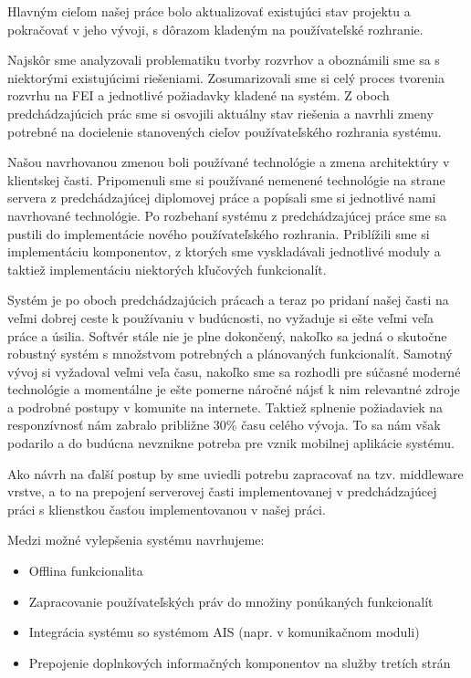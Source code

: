 Hlavným cieľom našej práce bolo aktualizovať existujúci stav projektu a pokračovať
v jeho vývoji, s dôrazom kladeným na používateľské rozhranie.

Najskôr sme analyzovali problematiku tvorby rozvrhov a oboznámili sme sa s niektorými
existujúcimi riešeniami. Zosumarizovali sme si celý proces tvorenia rozvrhu na FEI 
a jednotlivé požiadavky kladené na systém. Z oboch predchádzajúcich prác sme si osvojili aktuálny stav riešenia
a navrhli zmeny potrebné na docielenie stanovených cieľov používateľského rozhrania systému.

Našou navrhovanou zmenou boli používané technológie a zmena architektúry v klientskej časti.
Pripomenuli sme si používané nemenené technológie na strane servera z predchádzajúcej diplomovej
práce a popísali sme si jednotlivé nami navrhované technológie.
Po rozbehaní systému z predchádzajúcej práce sme sa pustili do implementácie nového používateľského rozhrania.
Priblížili sme si implementáciu komponentov, z ktorých sme vyskladávali jednotlivé moduly a taktiež implementáciu
niektorých kľučových funkcionalít.

Systém je po oboch predchádzajúcich prácach a teraz po pridaní našej časti na veľmi dobrej ceste
k používaniu v budúcnosti, no vyžaduje si ešte veľmi veľa práce a úsilia.
Softvér stále nie je plne dokončený, nakoľko sa jedná o skutočne robustný systém s množstvom
potrebných a plánovaných funkcionalít. Samotný vývoj si vyžadoval veľmi veľa času, nakoľko sme sa rozhodli
pre súčasné moderné technológie a momentálne je ešte pomerne náročné nájsť k nim relevantné zdroje
a podrobné postupy v komunite na internete. Taktiež splnenie požiadaviek na responzívnosť nám zabralo približne 30\%
času celého vývoja. To sa nám však podarilo a do budúcna nevznikne potreba pre vznik mobilnej aplikácie systému.

Ako návrh na ďalší postup by sme uviedli potrebu zapracovať na tzv. middleware vrstve, a to na prepojení 
serverovej časti implementovanej v predchádzajúcej práci s klienstkou časťou implementovanou v našej práci.

Medzi možné vylepšenia systému navrhujeme:
\begin{itemize}
\item Offlina funkcionalita
\item Zapracovanie používateľských práv do množiny ponúkaných funkcionalít
\item Integrácia systému so systémom AIS (napr. v komunikačnom moduli)
\item Prepojenie doplnkových informačných komponentov na služby tretích strán
\end{itemize}